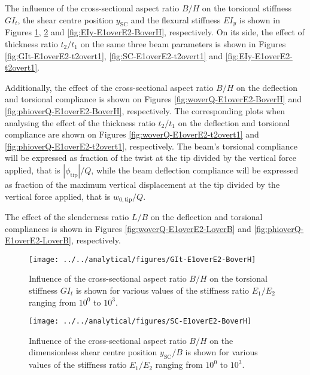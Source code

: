 The influence of the cross-sectional aspect ratio $B/H$ on the torsional stiffness $G I_t$, the shear centre position $y_{\mathrm{SC}}$ and the flexural stiffness $E I_y$ is shown in Figures \ref{fig:GIt-E1overE2-BoverH}, \ref{fig:SC-E1overE2-BoverH} and \ref{fig:EIy-E1overE2-BoverH}, respectively. On its side, the effect of thickness ratio $t_2/t_1$ on the same three beam parameters is shown in Figures \ref{fig:GIt-E1overE2-t2overt1}, \ref{fig:SC-E1overE2-t2overt1} and \ref{fig:EIy-E1overE2-t2overt1}.

Additionally, the effect of the cross-sectional aspect ratio $B/H$ on the deflection and torsional compliance is shown on Figures \ref{fig:woverQ-E1overE2-BoverH} and \ref{fig:phioverQ-E1overE2-BoverH}, respectively. The corresponding plots when analysing the effect of the thickness ratio $t_2/t_1$ on the deflection and torsional compliance are shown on Figures \ref{fig:woverQ-E1overE2-t2overt1} and \ref{fig:phioverQ-E1overE2-t2overt1}, respectively. The beam's torsional compliance will be expressed as fraction of the twist at the tip divided by the vertical force applied, that is $|\phi_{\mathrm{tip}}| / Q$, while the beam deflection compliance will be expressed as fraction of the maximum vertical displacement at the tip divided by the vertical force applied, that is $w_{\mathrm{0,tip}} / Q$.

The effect of the slenderness ratio $L/B$ on the deflection and torsional compliances is shown in Figures \ref{fig:woverQ-E1overE2-LoverB} and \ref{fig:phioverQ-E1overE2-LoverB}, respectively.

\begin{figure}[!htpb] %
  \centering
  \texttt{[image: ../../analytical/figures/GIt-E1overE2-BoverH]}
  \caption[Influence of the cross-sectional aspect ratio $B/H$ on the torsional stiffness $GI_t$]{Influence of the cross-sectional aspect ratio $B/H$ on the torsional stiffness $GI_t$ is shown for various values of the stiffness ratio $E_1/E_2$ ranging from $10^0$ to $10^3$. }\label{fig:GIt-E1overE2-BoverH}
\end{figure}

\begin{figure}[!htpb] %
  \centering
  \texttt{[image: ../../analytical/figures/SC-E1overE2-BoverH]}
  \caption[Influence of the cross-sectional aspect ratio $B/H$ on the dimensionless shear centre position $y_{\mathrm{SC}}/B$]{Influence of the cross-sectional aspect ratio $B/H$ on the dimensionless shear centre position $y_{\mathrm{SC}}/B$ is shown for various values of the stiffness ratio $E_1/E_2$ ranging from $10^0$ to $10^3$. }\label{fig:SC-E1overE2-BoverH}
\end{figure}

